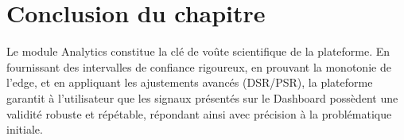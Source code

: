 \section*{Conclusion du chapitre}

Le module Analytics constitue la clé de voûte scientifique de la plateforme. En
fournissant des intervalles de confiance rigoureux, en prouvant la monotonie de l'edge,
et en appliquant les ajustements avancés (DSR/PSR), la plateforme garantit à l'utilisateur
que les signaux présentés sur le Dashboard possèdent une validité robuste et répétable,
répondant ainsi avec précision à la problématique initiale.